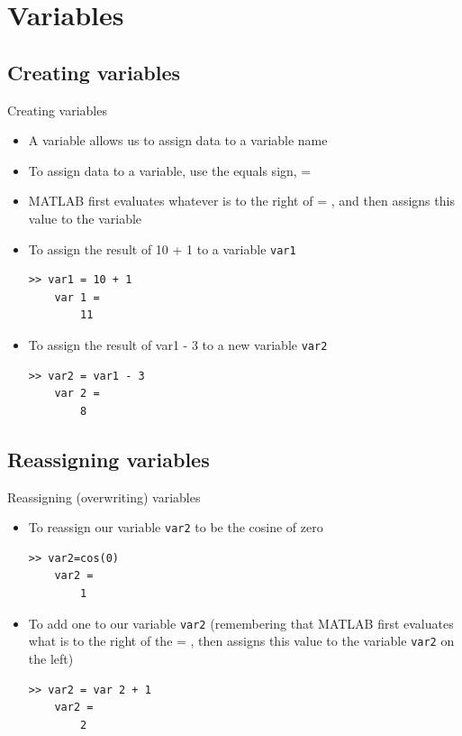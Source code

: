 \documentclass{beamer}
\begin{document}
\section{Variables}
\subsection{Creating variables}
\begin{frame}[fragile]{Creating variables}
	\begin{itemize}
		\item A variable allows us to assign data to a variable name
		\item To assign data to a variable, use the equals sign, =
		\item MATLAB first evaluates whatever is to the right of = , and then assigns this value to the variable
		\item To assign the result of 10 + 1 to a variable \texttt{var1}
		\begin{lstlisting}[style=Matlab-editor]
	>> var1 = 10 + 1
	var 1 = 
		11
		\end{lstlisting}
		\item To assign the result of var1 - 3 to a new variable \texttt{var2}
		\begin{lstlisting}[style=Matlab-editor]
	>> var2 = var1 - 3
	var 2 = 
		8
		\end{lstlisting}
	\end{itemize}
\end{frame}

\subsection{Reassigning variables}
\begin{frame}[fragile]{Reassigning (overwriting) variables}
	\begin{itemize}
		\item To reassign our variable \texttt{var2} to be the cosine of zero
		\begin{lstlisting}[style=Matlab-editor]
	>> var2=cos(0)
	var2 = 
		1
		\end{lstlisting}
		\item To add one to our variable \texttt{var2} (remembering that MATLAB first evaluates what is to the right of the  = , then assigns this value to the variable \texttt{var2} on the left)
		\begin{lstlisting}[style=Matlab-editor]
	>> var2 = var 2 + 1
	var2 = 
		2
		\end{lstlisting}
	\end{itemize}
\end{frame}
\end{document}
